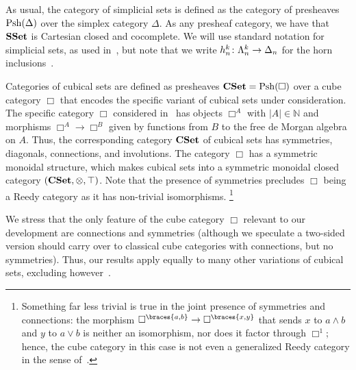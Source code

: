 \documentclass[reqno,10pt,a4paper,oneside,draft]{amsart}
\begin{document}
\begin{example} 
As usual, the category of simplicial sets is defined as the category of presheaves $\mathrm{Psh}(\Delta)$ over the simplex category $\Delta$.
As any presheaf category, we have that $\mathbf{SSet}$ is Cartesian closed and cocomplete. We will use standard notation for simplicial
sets, as used in~\cite{goerss-jardine}, but note that we write $h^k_n \colon \Lambda^k_n \to \Delta_n$
for the horn inclusions~\cite{joyal-tierney-notes}.
\end{example}


\begin{example}
Categories of cubical sets are defined as presheaves $\mathbf{CSet} = \mathrm{Psh}(\Box)$ over a cube category $\Box$ that encodes the specific variant of cubical sets under consideration.
The specific category $\Box$ considered in~\cite{coquand-variation} has objects $\Box^A$ with $|A| \in \mathbb{N}$ and morphisms $\Box^A \to \Box^B$ given by functions from $B$ to the free de Morgan algebra on $A$.
Thus, the corresponding category $\mathbf{CSet}$ of cubical sets has symmetries, diagonals, connections, and involutions.
The category $\Box$ has a symmetric monoidal structure, which makes cubical sets into a symmetric monoidal closed category $(\mathbf{CSet}, \otimes, \top)$.
Note that the presence of symmetries precludes $\Box$ being a Reedy category as it has non-trivial isomorphisms.%
\footnote{
Something far less trivial is true in the joint presence of symmetries and connections: the morphism $\Box^{\braces{a, b}} \to \Box^{\braces{x, y}}$ that sends $x$ to $a \wedge b$ and $y$ to $a \vee b$ is neither an isomorphism, nor does it factor through $\Box^1$; hence, the cube category in this case is not even a generalized Reedy category in the sense of~\cite{berger-moerdijk:generalized-reedy}.
}
\end{example}

We stress that the only feature of the cube category $\Box$ relevant to our development are connections and symmetries (although we speculate a two-sided version should carry over to classical cube categories with connections, but no symmetries).
Thus, our results apply equally to many other variations of cubical sets, excluding however~\cite{coquand-cubical-sets}.
\end{document}
